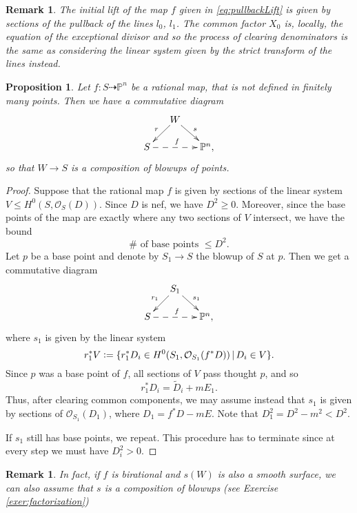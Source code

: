 \documentclass[a4paper,11pt]{amsart}
\newtheorem{proposition}[theorem]{Proposition}
\newtheorem{remark}[theorem]{Remark}
\newcommand{\OO}{\mathcal{O}}
\newcommand{\PP}{\mathbb{P}}
\newcommand{\defeq}{\vcentcolon=}
\newcommand{\rmap}{\dashrightarrow}
\begin{document}
\begin{remark}
	The initial lift of the map $f$ given in \eqref{eq:pullbackLift} is given by sections of the pullback of the lines $l_0$, $l_1$.
	The common factor $X_0$ is, locally, the equation of the exceptional divisor and so the process of clearing denominators is the same as considering the linear system given by the strict transform of the lines instead. 
\end{remark}

\begin{proposition}\label{prop:resolution}
	Let $f\colon S \rmap \PP^n$ be a rational map, that is not defined in finitely many points.
	Then we have a commutative diagram
	\[
	\xymatrix@R=.5cm@C=.5cm{
	& W \ar[ld]_r \ar[rd]^s\\
	S \ar@{-->}[rr]^f && \PP^n,
	}
	\]
	so that $W \to S$ is a composition of blowups of points.
\end{proposition}

\begin{proof}
	Suppose that the rational map $f$ is given by sections of the linear system $V \leq H^0(S,\OO_S(D))$.
	Since $D$ is nef, we have $D^2 \geq 0$.
	Moreover, since the base points of the map are exactly where any two sections of $V$ intersect, we have the bound
	\[
	\#\text{ of base points } \leq D^2.
	\]
	Let $p$ be a base point and denote by $S_1 \to S$ the blowup of $S$ at $p$.
	Then we get a commutative diagram 
	\[
	\xymatrix@R=.5cm@C=.5cm{
		& S_1 \ar[ld]_{r_1} \ar[rd]^{s_1}\\
		S \ar@{-->}[rr]^f && \PP^n,
	}
	\]
	where $s_1$ is given by the linear system
	\[
	r_1^*V \defeq \{r_1^*D_i \in H^0(S_1,\OO_{S_1}(f^*D)) \,|\, D_i \in V\}.
	\]
	Since $p$ was a base point of $f$, all sections of $V$ pass thought $p$, and so
	\[
	r_1^*D_i = \tilde{D}_i + m E_1.
	\]
	Thus, after clearing common components, we may assume instead that $s_1$ is given by sections of $\OO_{S_1}(D_1)$, where $D_1 = f^*D - mE$.
	Note that $D_1^2 = D^2 - m^2 < D^2$.
	
	If $s_1$ still has base points, we repeat.
	This procedure has to terminate since at every step  we must have $D_i^2 > 0$. 
\end{proof}

\begin{remark}\label{rem:factorization}
	In fact, if $f$ is birational and $s(W)$ is also a smooth surface, we can also assume that $s$ is a composition of blowups (see Exercise \ref{exer:factorization})
\end{remark}
\end{document}
